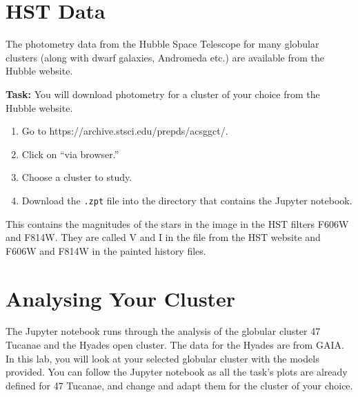 \documentclass{article}
\begin{document}
\section{HST Data}

The photometry data from the Hubble Space Telescope for many globular clusters (along with dwarf galaxies, Andromeda etc.) are available from the Hubble website.

\textbf{Task:}
You will download photometry for a cluster of your choice from the Hubble website.
\begin{enumerate}
 \setlength\itemsep{0em}
\item Go to https://archive.stsci.edu/prepds/acsggct/.  
\item Click on ``via browser.''
\item Choose a cluster to study.
\item Download the \texttt{.zpt} file into the directory that contains the Jupyter notebook.  
\end{enumerate}
This contains the magnitudes of the stars in the image in the HST filters F606W and F814W.  They are called V and I in the file from the HST website and F606W and F814W in the painted history files.

\section{Analysing Your Cluster}

The Jupyter notebook runs through the analysis of the globular cluster 47 Tucanae and the Hyades open cluster.  The data for the Hyades are from GAIA.  In this lab, you will look at your selected globular cluster with the models provided. You can follow the Jupyter notebook as all the task's plots are already defined for 47 Tucanae, and change and adapt them for the cluster of your choice.
\end{document}
